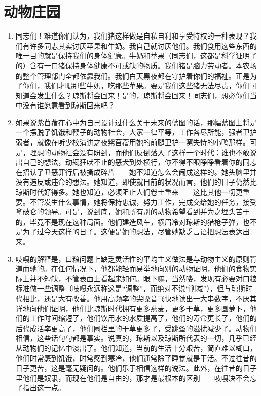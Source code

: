 \documentclass[UTF8]{ctexart}
\begin{document}
	
	\newpage
	
	\section{动物庄园}
	
		
		\begin{enumerate}
			\item 同志们！难道你们认为，我们猪这样做是自私自利和享受特权的一种表现？我们有许多同志其实讨厌苹果和牛奶。我自己就讨厌他们。我们食用这些东西的唯一目的就是保持我们的身体健康。牛奶和苹果（同志们，这都是科学证明了的）含有一口猪保持身体健康不可或缺的物质。我们猪是脑力劳动者。本农场的整个管理部门全都依靠我们。我们白天黑夜都在守护着你们的福祉。正是为了你们，我们才喝那些牛奶，吃那些苹果。要是我们这些猪无法尽责，你们可知道会发生什么？琼斯将会回来！是的，琼斯将会回来！同志们，想必你们当中没有谁愿意看到琼斯回来吧？
			
			\item 如果说紫苜蓿在心中为自己设计过什么关于未来的蓝图的话，那幅蓝图上将是一个摆脱了饥饿和鞭子的动物社会，大家一律平等，工作各尽所能，强者卫护弱者，就像在听少校演讲之夜紫苜蓿用她的前腿卫护一窝失恃的小鸭那样。可是，理想的动物社会没有盼到，而他们反倒落入了这样一个时代：谁也不敢说出自己的想法，动辄狂吠不止的恶犬到处横行，你不得不眼睁睁看着你的同志在招认了丑恶罪行后被撕成碎片——她不知道怎么会闹成这样的。她头脑里并没有造反或违命的想法。她知道，即使就目前的状况而言，他们的日子仍然比琼斯时代好得多。她也知道，必须阻止人们卷土重来——这比其他一切更重要。不管发生什么事情，她将保持忠诚，努力工作，完成交给她的任务，接受拿破仑的领导。可是，说到底，她和所有别的动物希望看到并为之埋头苦干的，毕竟不是现在这种局面。他们建造风车，横眉冷对琼斯的猎枪子弹，也不是为了过今天这样的日子。这便是她的想法，尽管她缺乏言语把想法表达出来。
			
			\item 吱嘎的解释是，口粮问题上缺乏灵活性的平均主义做法是与动物主义的原则背道而驰的。在任何情况下，他都能轻而易举地向别的动物证明，他们的食物实际上并不短缺，不管表面上看起来如何。眼下嘛，当然喽，发现有必要对口粮标准做一些调整（吱嘎永远称这是“调整”，而绝对不说“削减”），但与琼斯时代相比，还是大有改善。他用高频率的尖嗓音飞快地读出一大串数字，不厌其详地向他们证明，他们比琼斯时代拥有更多燕麦，更多干草，更多圆萝卜，他们的工作时间缩短了，他们饮用水的水质提高了，他们的寿命更长了，他们的后代成活率更高了，他们圈栏里的干草更多了，受跳蚤的滋扰减少了。动物们相信，这些话句句都是事实。说真的，琼斯以及琼斯所代表的一切，几乎已经从动物们的记忆中淡出了。他们知道，当前的生活十分艰苦，简直难以糊口，他们时常感到饥饿，时常感到寒冷，他们通常除了睡觉就是干活。不过往昔的日子更苦，这是毫无疑问的。他们乐于相信这样的说法。此外，在往昔的日子里他们是奴隶，而现在他们是自由的，那才是最根本的区别——吱嘎决不会忘了指出这一点。
			

\end{enumerate}
\end{document}
